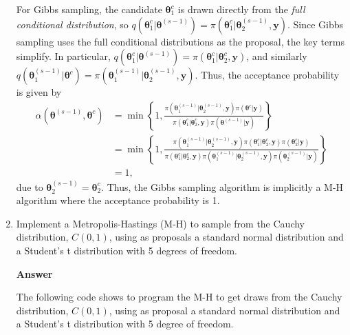 \begin{enumerate}[leftmargin=*]
For Gibbs sampling, the candidate $\bm{\theta}^c_1$ is drawn directly from the \emph{full conditional distribution}, so $q(\bm{\theta}^c_1 | \bm{\theta}^{(s-1)}) = \pi(\bm{\theta}^c_1 | \bm{\theta}^{(s-1)}_2, \bm{y})$. Since Gibbs sampling uses the full conditional distributions as the proposal, the key terms simplify. In particular, $q(\bm{\theta}^c_1 | \bm{\theta}^{(s-1)}) = \pi(\bm{\theta}^c_1 | \bm{\theta}^{c}_2, \bm{y})$, and similarly $q(\bm{\theta}^{(s-1)}_1 | \bm{\theta}^c) = \pi(\bm{\theta}^{(s-1)}_1 | \bm{\theta}^{(s-1)}_2, \bm{y})$. Thus, the acceptance probability is given by 
\begin{align*}
	\alpha(\bm{\theta}^{(s-1)}, \bm{\theta}^c) & = \min\left\{ 1, \frac{\pi(\bm{\theta}^{(s-1)}_1 | \bm{\theta}_2^{(s-1)}, \bm{y}) \pi(\bm{\theta}^c | \bm{y})}{\pi(\bm{\theta}^c_1 | \bm{\theta}^{c}_2, \bm{y}) \pi(\bm{\theta}^{(s-1)} | \bm{y})} \right\}\\
	&= \min\left\{ 1, \frac{\pi(\bm{\theta}^{(s-1)}_1 | \bm{\theta}_2^{(s-1)}, \bm{y}) \pi(\bm{\theta}^c_1 | \bm{\theta}^c_2, \bm{y})\pi(\bm{\theta}^c_2 | \bm{y})}{\pi(\bm{\theta}^c_1 | \bm{\theta}^{c}_2, \bm{y}) \pi(\bm{\theta}^{(s-1)}_1 | \bm{\theta}^{(s-1)}_2, \bm{y}) \pi(\bm{\theta}^{(s-1)}_2 | \bm{y})} \right\}\\
	&=1,
\end{align*}
due to $\bm{\theta}^{(s-1)}_2=\bm{\theta}^{c}_2$. Thus, the Gibbs sampling algorithm is implicitly a M-H algorithm where the acceptance probability is 1.

\item Implement a Metropolis-Hastings (M-H) to sample from the Cauchy distribution, $C(0,1)$, using as proposals a standard normal distribution and a Student's t distribution with 5 degrees of freedom. 

\textbf{Answer}

The following code shows to program the M-H to get draws from the Cauchy distribution, $C(0,1)$, using as proposal a standard normal distribution and a Student's t distribution with 5 degree of freedom.


\end{enumerate}
